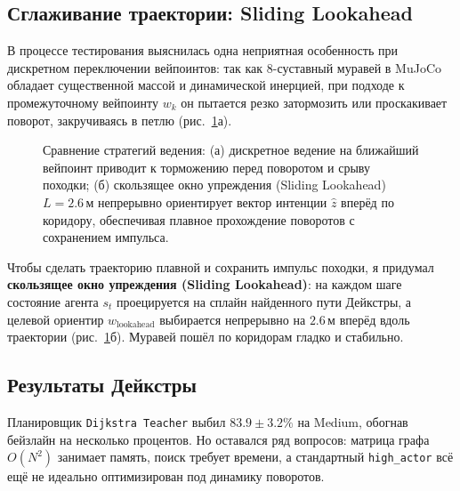 \subsection{Сглаживание траектории: Sliding Lookahead}

В процессе тестирования выяснилась одна неприятная особенность при дискретном переключении вейпоинтов: так как 8-суставный муравей в MuJoCo обладает существенной массой и динамической инерцией, при подходе к промежуточному вейпоинту $w_k$ он пытается резко затормозить или проскакивает поворот, закручиваясь в петлю (рис.~\ref{fig:sliding_lookahead}а).

\begin{figure}[H]
    \centering
    
    \caption{Сравнение стратегий ведения: (а) дискретное ведение на ближайший вейпоинт приводит к торможению перед поворотом и срыву походки; (б) скользящее окно упреждения (Sliding Lookahead) $L = 2.6\,\text{м}$ непрерывно ориентирует вектор интенции $\hat{z}$ вперёд по коридору, обеспечивая плавное прохождение поворотов с сохранением импульса.}
    \label{fig:sliding_lookahead}
\end{figure}

Чтобы сделать траекторию плавной и сохранить импульс походки, я придумал \textbf{скользящее окно упреждения (Sliding Lookahead)}: на каждом шаге состояние агента $s_t$ проецируется на сплайн найденного пути Дейкстры, а целевой ориентир $w_{\text{lookahead}}$ выбирается непрерывно на $2.6\,\text{м}$ вперёд вдоль траектории (рис.~\ref{fig:sliding_lookahead}б). Муравей пошёл по коридорам гладко и стабильно.

\subsection{Результаты Дейкстры}
Планировщик \texttt{Dijkstra Teacher} выбил $83.9 \pm 3.2\%$ на Medium, обогнав бейзлайн на несколько процентов. Но оставался ряд вопросов: матрица графа $O(N^2)$ занимает память, поиск требует времени, а стандартный \texttt{high\_actor} всё ещё не идеально оптимизирован под динамику поворотов.
